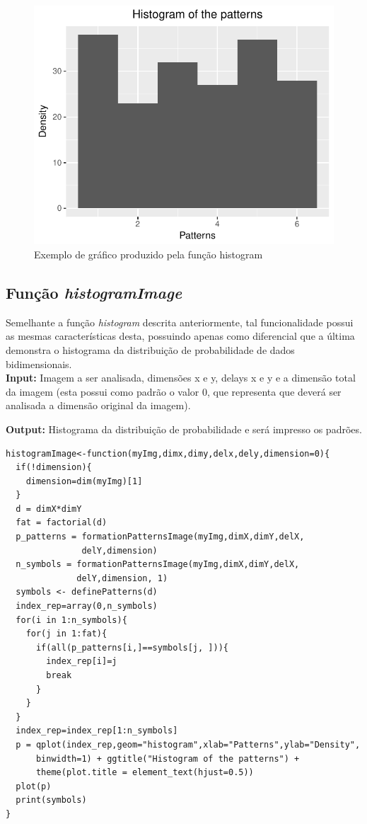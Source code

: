 \documentclass[12pt,letterpaper]{article}
\begin{document}
\begin{figure}[!hbt]
	\begin{center}
		\includegraphics[width=\columnwidth]{histogram.pdf}
		\caption{Exemplo de gráfico produzido pela função histogram}
		\label{fig:histogram.pdf}
	\end{center}
\end{figure}

\subsection{Função \textit{histogramImage}}

Semelhante a função \textit{histogram} descrita anteriormente, tal funcionalidade possui as mesmas características desta, possuindo apenas como diferencial que a última demonstra o histograma da distribuição de probabilidade de dados bidimensionais.\\

\textbf{Input: } Imagem a ser analisada, dimensões x e y, delays x e y e a dimensão total da imagem (esta possui como padrão o valor 0, que representa que deverá ser analisada a dimensão original da imagem).

\textbf{Output: } Histograma da distribuição de probabilidade e será impresso os padrões.\\ 

\begin{lstlisting}
histogramImage<-function(myImg,dimx,dimy,delx,dely,dimension=0){  
  if(!dimension){
    dimension=dim(myImg)[1]
  }
  d = dimX*dimY
  fat = factorial(d)
  p_patterns = formationPatternsImage(myImg,dimX,dimY,delX,
  			   delY,dimension)
  n_symbols = formationPatternsImage(myImg,dimX,dimY,delX,
  			  delY,dimension, 1)
  symbols <- definePatterns(d)
  index_rep=array(0,n_symbols)
  for(i in 1:n_symbols){
    for(j in 1:fat){
      if(all(p_patterns[i,]==symbols[j, ])){
        index_rep[i]=j
        break
      }
    }
  }
  index_rep=index_rep[1:n_symbols]
  p = qplot(index_rep,geom="histogram",xlab="Patterns",ylab="Density",
  	  binwidth=1) + ggtitle("Histogram of the patterns") +
      theme(plot.title = element_text(hjust=0.5))
  plot(p)
  print(symbols)
}
\end{lstlisting}
\end{document}
